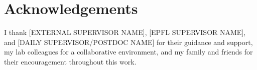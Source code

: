 \section*{Acknowledgements}

\bigskip

\noindent I thank [EXTERNAL SUPERVISOR NAME], [EPFL SUPERVISOR NAME], and [DAILY SUPERVISOR/POSTDOC NAME] for their guidance and support, my lab colleagues for a collaborative environment, and my family and friends for their encouragement throughout this work. \bigskip

